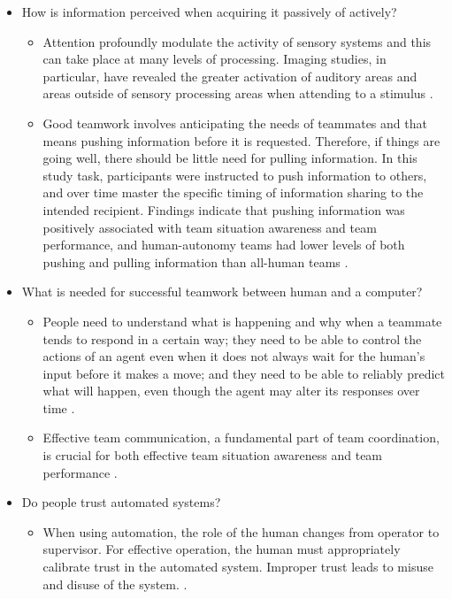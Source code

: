 \begin{itemize}
	\item How is information perceived when acquiring it passively of actively?
	\begin{itemize}
		\item Attention profoundly modulate the activity of sensory systems and this can take place at many levels of processing. Imaging studies, in particular, have revealed the greater activation of auditory areas and areas outside of sensory processing areas when attending to a stimulus \cite{Palmer2007}.
		\item Good teamwork involves anticipating the needs of teammates and that means pushing information before it is requested. Therefore, if things are going well, there should be little need for pulling information. In this study task, participants were instructed to push information to others, and over time master the specific timing of information sharing to the intended recipient. Findings indicate that pushing information was positively associated with team situation awareness and team performance, and human-autonomy teams had lower levels of both pushing and pulling information than all-human teams \cite{Demir2017}.
	\end{itemize}
	
	\item What is needed for successful teamwork between human and a computer?
	\begin{itemize}
		\item  People need to understand what is happening and why when a teammate tends to respond in a certain way; they need to be able to control the actions of an agent even when it does not always wait for the human’s input before it makes a move; and they need to be able to reliably predict what will happen, even though the agent may alter its responses over time \cite{Bradshaw2003}.
		\item Effective team communication, a fundamental part of team coordination, is crucial for both effective team situation awareness and team performance \cite{Demir2017}.
	\end{itemize}
	
	\item Do people trust automated systems?
	\begin{itemize}
		\item When using automation, the role of the human changes from operator to supervisor. For effective operation, the human must appropriately calibrate trust in the automated system. Improper trust leads to misuse and disuse of the system. \cite{Walliser2011}.
	\end{itemize}
\end{itemize}

